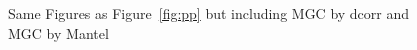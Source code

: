 \documentclass[11pt]{article}
\begin{document}
\begin{figure}[htbp]
\hfil
{}
\hfil
{}
\hfil
{}
\caption{Same Figures as Figure~\ref{fig:pp} but including MGC by dcorr and MGC by Mantel}
\label{fig:pp2}
\end{figure}
\end{document}
